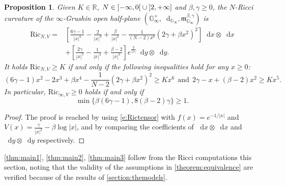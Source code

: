 \documentclass[11pt,twoside,a4paper]{article}
\newcommand{\red}{\color{red}}
\newcommand*\diff{\mathop{}\!\mathrm{d}}
\newcommand{\R}{\mathbb{R}}
\newcommand{\Ric}{\mathrm{Ric}}
\newcommand{\G}{\mathbb{G}}
\theoremstyle{theorem}
\newtheorem{prop}[theorem]{Proposition}
\theoremstyle{definition}
\theoremstyle{remark}
\theoremstyle{proof}
\begin{document}

\begin{prop}
    Given $K \in \R$, $N \in \ointerval{-\infty}{0} \cup \linterval{2}{+\infty}$ and $\beta,
    \gamma\geq 0$, the $N$-Ricci curvature of the $\infty$-Grushin open half-plane $(\G_\infty^+, \diff_{\G_\infty}, \mathfrak{m}^{\beta,\gamma}_{\G_\infty})$ is
\begin{align*}
    \Ric_{N,V}=&\left[\frac{6\gamma-1}{|x|^4}-\frac{2}{|x|^3}+\frac{\beta}{|x|^2}-\frac{1}{(N-2)x^6}\left(2\gamma+\beta x^2\right)^2\right]\diff x\otimes \diff x\\
    &+\left[\frac{2\gamma}{|x|^5}-\frac{1}{|x|^4}+\frac{\beta-2}{|x|^3}\right]e^{\frac{2}{|x|}}\diff y\otimes\diff y.
\end{align*}
    It holds $\Ric_{N,V} \geq K$ if and only if the following inequalities hold for any $x\geq 0$:
\[(6\gamma-1)x^2-2x^3+\beta x^4-\frac{1}{N-2}(2\gamma+\beta x^2)^2\geq Kx^6~~\text{and}~~2\gamma-x+(\beta-2)x^2\geq Kx^5.\]
In particular, $\Ric_{\infty,V}\geq 0$ holds if and only if
\[\min\{\beta(6\gamma-1),8(\beta-2)\gamma\}\geq 1.\]
\end{prop}

\begin{proof}
The proof is reached by using \cref{e:Rictensor} with $f(x)=e^{-1/|x|}$ and $V(x)=\frac{\gamma}{|x|^2}-\beta\log|x|$, and by comparing the coefficients of $\diff x\otimes \diff x$ and $\diff y\otimes \diff y$ respectively.
\end{proof}

\cref{thm:main1}, \cref{thm:main2}, \cref{thm:main3} follow from the Ricci computations this section, noting that the validity of the assumptions in \cref{theorem:equivalence} are verified because of the results of \cref{section:themodels}.
\end{document}
